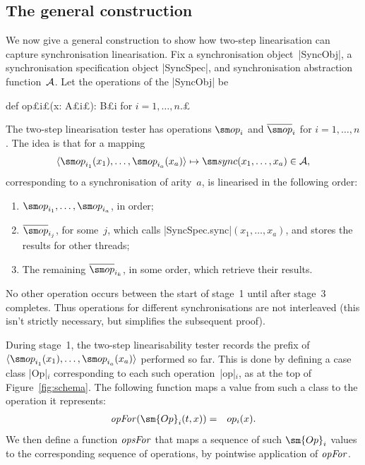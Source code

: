 
\subsection{The general construction}
\label{ssec:relating-general}

We now give a general construction to show how two-step linearisation can
capture synchronisation linearisation. 
%
Fix a synchronisation object~|SyncObj|, a synchronisation specification object
|SyncSpec|, and synchronisation abstraction function~$\mathcal{A}$.  Let the operations
of the |SyncObj| be
\begin{scala}
  def op£\s i£(x: A£\s i£): B£\s i \qquad for $i = 1,\ldots,n$.£
\end{scala}

The two-step linearisation tester has operations $\op_i$ and
$\overline\op_i$ for $i = 1,\ldots,n$. 
%
The idea is that for a mapping 
\[
\seq{\op_{i_1}(x_1), \ldots, \op_{i_a}(x_a)}
  \mapsto \sync(x_1,\ldots,x_a)  \in \A,
\]
corresponding to a synchronisation of arity~$a$, is linearised in the
following order:
\begin{enumerate}
\item $\op_{i_1},\ldots,\op_{i_a}$, in order;

\item $\overline\op_{i_j}$, for some~$j$, which  calls
  |SyncSpec.sync|$(x_1,\ldots,x_a)$, and stores the results for other threads;

\item The remaining $\overline\op_{i_k}$, in some order, which  retrieve
  their results.
\end{enumerate}
%
No other operation occurs between the start of stage~1 until after stage~3
completes.  Thus operations for different synchronisations are not interleaved
(this isn't strictly necessary, but simplifies the subsequent proof). 


During stage~1, the two-step linearisability tester records the prefix of
$\seq{\op_{i_1}(x_1), \ldots, \op_{i_a}(x_a)}$ performed so far.  This is done
by defining a case class |Op|$_i$ corresponding to each such
operation~|op|$_i$, as at the top of Figure~\ref{fig:schema}.
%
%
The following function maps a value from such a class to the operation it
represents:
\begin{eqnarray*}
\opFor(\sm{Op}_i(t,x)) & = & op_i(x).
\end{eqnarray*}
%
We then define a function $\mathop{\it opsFor}$ that maps a sequence of such $\sm{Op}_i$
values to the corresponding sequence of operations, by pointwise application
of $\mathop{\it opFor}$.
%

